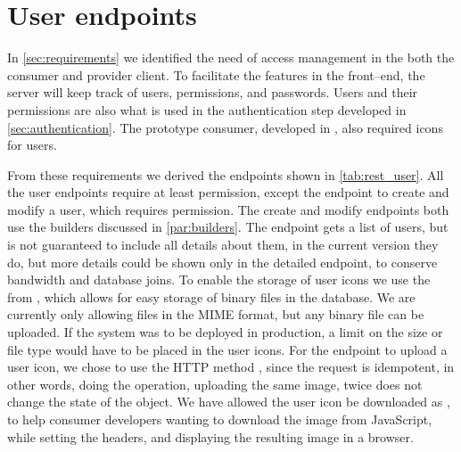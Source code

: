 \section{User endpoints}

In \cref{sec:requirements} we identified the need of access management in the
both the consumer and provider client. To facilitate the features in the
front--end, the server will keep track of users, permissions, and passwords.
Users and their permissions are also what is used in the authentication step
developed in \cref{sec:authentication}. The prototype consumer, developed in
, also required icons for users.


From these requirements we derived the endpoints shown in \cref{tab:rest_user}.
All the user endpoints require at least  permission, except the
endpoint to create and modify a user, which requires 
permission. The create and modify endpoints both use the builders discussed in
\cref{par:builders}. The  endpoint gets a list of users,
but is not guaranteed to include all details about them, in the current version
they do, but more details could be shown only in the detailed 
endpoint, to conserve bandwidth and database joins. To enable the storage of
user icons we use the  from ,
which allows for easy storage of binary files in the database. We are currently
only allowing files in the  \ac{MIME} format, but any binary
file can be uploaded.  If the system was to be deployed in production, a limit
on the size or file type would have to be placed in the user icons. For the
endpoint to upload a user icon, we chose to use the HTTP method ,
since the request is idempotent, in other words, doing the operation, uploading
the same image, twice does not change the state of the object. We have allowed
the user icon be downloaded as , to help consumer developers
wanting to download the image from JavaScript, while setting the headers, and
displaying the resulting image in a browser.

